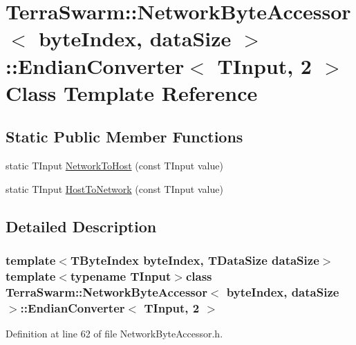 \hypertarget{class_terra_swarm_1_1_network_byte_accessor_1_1_endian_converter_3_01_t_input_00_012_01_4}{\section{Terra\-Swarm\-:\-:Network\-Byte\-Accessor$<$ byte\-Index, data\-Size $>$\-:\-:Endian\-Converter$<$ T\-Input, 2 $>$ Class Template Reference}
\label{class_terra_swarm_1_1_network_byte_accessor_1_1_endian_converter_3_01_t_input_00_012_01_4}
}
\subsection*{Static Public Member Functions}
\begin{DoxyCompactItemize}
\item 
static T\-Input \hyperlink{class_terra_swarm_1_1_network_byte_accessor_1_1_endian_converter_3_01_t_input_00_012_01_4_a595e5e26bf4e3360e6d7136dce04cee0}{Network\-To\-Host} (const T\-Input value)
\item 
static T\-Input \hyperlink{class_terra_swarm_1_1_network_byte_accessor_1_1_endian_converter_3_01_t_input_00_012_01_4_a84a61b152631ff4c071405f984f37398}{Host\-To\-Network} (const T\-Input value)
\end{DoxyCompactItemize}


\subsection{Detailed Description}
\subsubsection*{template$<$T\-Byte\-Index byte\-Index, T\-Data\-Size data\-Size$>$template$<$typename T\-Input$>$class Terra\-Swarm\-::\-Network\-Byte\-Accessor$<$ byte\-Index, data\-Size $>$\-::\-Endian\-Converter$<$ T\-Input, 2 $>$}



Definition at line 62 of file Network\-Byte\-Accessor.\-h.



